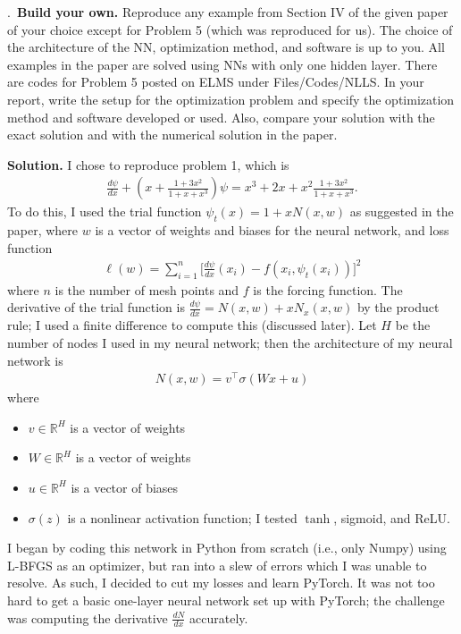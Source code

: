 \documentclass{letter}
\newcounter{problem}
\newcounter{solution}
\newcommand{\Problem}[2]{%
	\stepcounter{problem}%
	\leftskip=0pt%
	\theproblem.~\textbf{{#1.}} #2 \par%
}
\newcommand{\Solution}[1]{%
	\textbf{Solution.} #1 \par%
}
\newcommand{\T}{\intercal}
\newcommand{\R}{\mathbb{R}}
\begin{document}
    \Problem{Build your own}{Reproduce any example from Section IV of the given paper of your choice except for Problem 5 (which was reproduced for us). The choice of the architecture of the NN, optimization method, and software is up to you. All examples in the paper are solved using NNs with only one hidden layer. There are codes for Problem 5 posted on ELMS under Files/Codes/NLLS. In your report, write the setup for the optimization problem and specify the optimization method and software developed or used. Also, compare your solution with the exact solution and with the numerical solution in the paper.}
    \Solution{I chose to reproduce problem 1, which is \begin{align*}
        \frac{d\psi}{dx} + (x + \frac{1 + 3x^2}{1 + x + x^3})\psi = x^3 + 2x + x^2\frac{1 + 3x^2}{1 + x + x^3}.
    \end{align*} To do this, I used the trial function $\psi_t(x) = 1 + xN(x,w)$ as suggested in the paper, where $w$ is a vector of weights and biases for the neural network, and loss function \begin{align*}
        \ell(w) = \sum_{i = 1}^n \Big[\frac{d\psi}{dx}(x_i) - f(x_i, \psi_t(x_i)) \Big]^2
    \end{align*} where $n$ is the number of mesh points and $f$ is the forcing function. The derivative of the trial function is $\frac{d\psi}{dx} = N(x,w) + xN_x(x,w)$ by the product rule; I used a finite difference to compute this (discussed later). Let $H$ be the number of nodes I used in my neural network; then the architecture of my neural network is \begin{align*}
        N(x,w) = v^\T \sigma(Wx + u)
    \end{align*} where \begin{itemize}
        \item $v \in \R^H$ is a vector of weights
        \item $W \in \R^H$ is a vector of weights
        \item $u \in \R^H$ is a vector of biases
        \item $\sigma(z)$ is a nonlinear activation function; I tested $\tanh$, sigmoid, and ReLU.
    \end{itemize} I began by coding this network in Python from scratch (i.e., only Numpy) using L-BFGS as an optimizer, but ran into a slew of errors which I was unable to resolve. As such, I decided to cut my losses and learn PyTorch. It was not too hard to get a basic one-layer neural network set up with PyTorch; the challenge was computing the derivative $\frac{dN}{dx}$ accurately.
    
}
\end{document}
